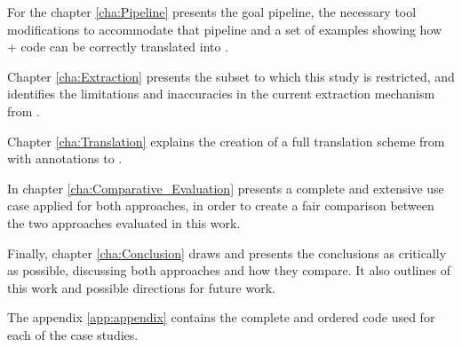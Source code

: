 For the chapter \ref{cha:Pipeline} presents the goal pipeline, the necessary tool modifications to accommodate that pipeline and
a set of examples showing how \ocaml + \gospel code can be correctly translated into \cml. 

Chapter \ref{cha:Extraction} presents the \cml subset to which this study is restricted, and identifies the limitations and
inaccuracies in the current extraction mechanism from \whythree.

Chapter \ref{cha:Translation} explains the creation of a full translation scheme from \cml with \gospel annotations to \whyml.

In chapter \ref{cha:Comparative_Evaluation} presents a complete and extensive use case applied for both approaches, in order to 
create a fair comparison between the two approaches evaluated in this work.

Finally, chapter \ref{cha:Conclusion} draws and presents the conclusions as critically as possible, discussing both
approaches and how they compare. It also outlines of this work and possible directions for future work.

The appendix \ref{app:appendix} contains the complete and ordered code used for each of the case studies.